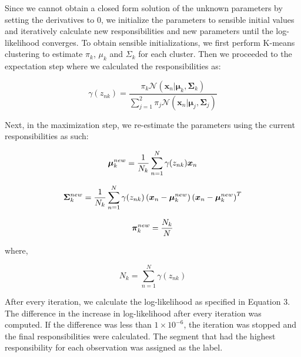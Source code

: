 \documentclass{article}
\begin{document}
    \noindent
    Since we cannot obtain a closed form solution of the unknown parameters by setting the derivatives to 0, we initialize the parameters to sensible initial values and iteratively calculate new responsibilities and new parameters until the log-likelihood converges.
    To obtain sensible initializations, we first perform K-means clustering to estimate $\pi_k$, $\mu_k$ and $\Sigma_k$ for each cluster. Then we proceeded to the expectation step where we calculated the responsibilities as:

    \begin{equation}
        \gamma(z_{nk}) = \frac{\pi_k \mathcal{N} \left(\bm{x}_n|\bm{\mu}_k,\bm{\Sigma}_k\right)}{\sum_{j=1}^{2} \pi_j \mathcal{N} \left(\bm{x}_n|\bm{\mu}_j,\bm{\Sigma}_j\right)}
    \end{equation}

    \noindent
    Next, in the maximization step, we re-estimate the parameters using the current responsibilities as such:

    \begin{equation}
        \bm{\mu}_k^{\mathnormal{new}} = \frac{1}{N_k}\sum_{n=1}^N\gamma(z_{nk})\bm{x}_n
    \end{equation}

    \begin{equation}
        \bm{\Sigma}_k^{\mathnormal{new}} = \frac{1}{N_k}\sum_{n=1}^N\gamma(z_{nk})\left(\bm{x}_n-\bm{\mu}_k^{\mathnormal{new}}\right)\left(\bm{x}_n-\bm{\mu}_k^{\mathnormal{new}}\right)^T
    \end{equation}

    \begin{equation}
        \bm{\pi}_k^{\mathnormal{new}} = \frac{N_k}{N}
    \end{equation}

    \noindent
    where,

    \begin{equation}
        N_k = \sum_{n=1}^N\gamma(z_{nk})
    \end{equation}

    \noindent
    After every iteration, we calculate the log-likelihood as specified in Equation 3.  The difference in the increase in log-likelihood after every iteration was computed. If the difference was less than $1\times10^{-6}$, the iteration was stopped and the final responsibilities were calculated.
    The segment that had the highest responsibility for each observation was assigned as the label. \\
\end{document}
